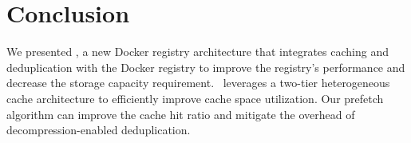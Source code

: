 \section{Conclusion}
\label{sec:conclusion}
We presented \sysname, a new Docker registry architecture that integrates caching and deduplication with the Docker registry 
to
improve the registry's performance and decrease the storage capacity requirement. 
\sysname~leverages a two-tier heterogeneous cache architecture to efficiently improve cache space 
utilization. Our prefetch algorithm can improve the cache hit ratio and mitigate the overhead of decompression-enabled deduplication.
